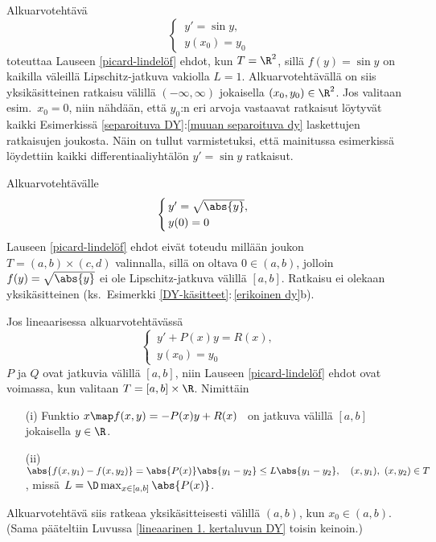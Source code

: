 \begin{Exa}
Alkuarvotehtävä
\[
\begin{cases} \,y'=\sin y, \\ \,y(x_0)=y_0 \end{cases}
\]
toteuttaa Lauseen \ref{picard-lindelöf} ehdot, kun $T=\R^2$, sillä $f(y)=\sin y$ on kaikilla 
väleillä Lipschitz-jatkuva vakiolla $L=1$. Alkuarvotehtävällä on siis yksikäsitteinen ratkaisu
välillä $(-\infty,\infty)$ jokaisella $(x_0,y_0)\in\R^2$. Jos valitaan esim.\ $x_0=0$, niin
nähdään, että $y_0$:n eri arvoja vastaavat ratkaisut löytyvät kaikki Esimerkissä 
\ref{separoituva DY}:\ref{muuan separoituva dy} laskettujen ratkaisujen joukosta. Näin on tullut
varmistetuksi, että mainitussa esimerkissä löydettiin kaikki differentiaaliyhtälön $y'=\sin y$
ratkaisut. \loppu
\end{Exa}
\begin{Exa}
Alkuarvotehtävälle
\[
\begin{cases} \,y'=\sqrt{\abs{y}}, \\ \,y(0)=0 \end{cases}
\]
Lauseen \ref{picard-lindelöf} ehdot eivät toteudu millään joukon $T=(a,b)\times(c,d)$
valinnalla, sillä on oltava $0\in(a,b)$, jolloin $f(y)=\sqrt{\abs{y}}$ ei ole Lipschitz-jatkuva
välillä $[a,b]$. Ratkaisu ei olekaan yksikäsitteinen 
(ks.\ Esimerkki \ref{DY-käsitteet}:\,\ref{erikoinen dy}b). \loppu
\end{Exa}
\begin{Exa}
Jos lineaarisessa alkuarvotehtävässä
\[
\begin{cases}
\,y'+P(x)y=R(x), \\ \,y(x_0)=y_0
\end{cases}
\]
$P$ ja $Q$ ovat jatkuvia välillä $[a,b]$, niin Lauseen \ref{picard-lindelöf} ehdot ovat 
voimassa, kun valitaan $T=[a,b]\times\R$. Nimittäin
\begin{itemize}
\item[(i)]  Funktio $x \map f(x,y)=-P(x)y+R(x)$ \ on jatkuva välillä $[a,b]$ jokaisella
            $y\in\R$.
\item[(ii)] $\abs{f(x,y_1)-f(x,y_2)}=\abs{P(x)}\abs{y_1-y_2}\leq L\abs{y_1-y_2},\quad 
             (x,y_1), \ (x,y_2) \in T$, missä $L=\D \max_{x\in [a,b]} \abs{P(x)}$.
\end{itemize}
Alkuarvotehtävä siis ratkeaa yksikäsitteisesti välillä $(a,b)$, kun $x_0\in (a,b)$.
(Sama pääteltiin Luvussa \ref{lineaarinen 1. kertaluvun DY} toisin keinoin.) \loppu
\end{Exa}

